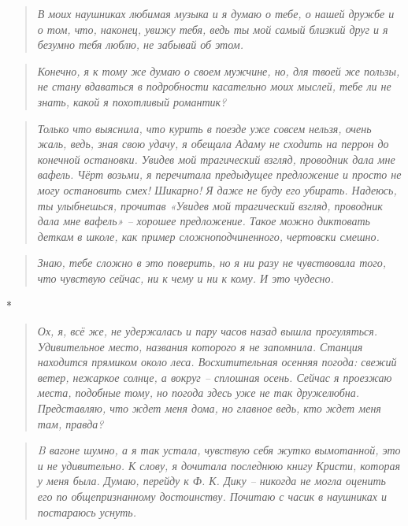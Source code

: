 \documentclass[
  a5paperpaper,
  DIV=11,
  numbers=noendperiod]{scrreprt}
\begin{document}
\begin{quote}
\emph{В моих наушниках любимая музыка и я думаю о тебе, о нашей дружбе и
о том, что, наконец, увижу тебя, ведь ты мой самый близкий друг и я
безумно тебя люблю, не забывай об этом.}
\end{quote}

\begin{quote}
\emph{Конечно, я к тому же думаю о своем мужчине, но, для твоей же
пользы, не стану вдаваться в подробности касательно моих мыслей, тебе ли
не знать, какой я похотливый романтик?}
\end{quote}

\begin{quote}
\emph{Только что выяснила, что курить в поезде уже совсем нельзя, очень
жаль, ведь, зная свою удачу, я обещала Адаму не сходить на перрон до
конечной остановки. Увидев мой трагический взгляд, проводник дала мне
вафель. Чёрт возьми, я перечитала предыдущее предложение и просто не
могу остановить смех! Шикарно! Я даже не буду его убирать. Надеюсь, ты
улыбнешься, прочитав «Увидев мой трагический взгляд, проводник дала мне
вафель» -- хорошее предложение. Такое можно диктовать деткам в школе,
как пример сложноподчиненного, чертовски смешно.}
\end{quote}

\begin{quote}
\emph{Знаю, тебе сложно в это поверить, но я ни разу не чувствовала
того, что чувствую сейчас, ни к чему и ни к кому. И это чудесно.}
\end{quote}

*

\begin{quote}
\emph{Ох, я, всё же, не удержалась и пару часов назад вышла прогуляться.
Удивительное место, названия которого я не запомнила. Станция находится
прямиком около леса. Восхитительная осенняя погода: свежий ветер,
нежаркое солнце, а вокруг -- сплошная осень. Сейчас я проезжаю места,
подобные тому, но погода здесь уже не так дружелюбна. Представляю, что
ждет меня дома, но главное ведь, кто ждет меня там, правда?}
\end{quote}

\begin{quote}
\emph{B вагоне шумно, а я так устала, чувствую себя жутко вымотанной,
это и не удивительно. К слову, я дочитала последнюю книгу Кристи,
которая у меня была. Думаю, перейду к Ф. К. Дику -- никогда не могла
оценить его по общепризнанному достоинству. Почитаю с часик в наушниках
и постараюсь уснуть.}
\end{quote}
\end{document}
